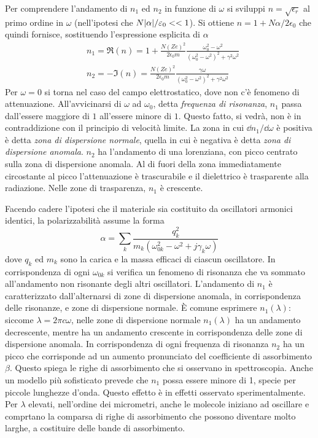 Per comprendere l'andamento di $n_1$ ed $n_2$ in funzione di $\omega$ si sviluppi $n=\sqrt{\epsilon_r}$ al primo
ordine in $\omega$ (nell'ipotesi che $N\abs{\alpha}/\varepsilon_0<<1$). Si ottiene $n=1+N\alpha/2\epsilon_0$ che
quindi fornisce, sostituendo l'espressione esplicita di $\alpha$
\[
    \begin{split}
        & n_1=\Re(n)=1+\frac{N(Ze)^2}{2\epsilon_0 m} \frac{\omega_0^2 -\omega^2}{(\omega_0^2 -\omega^2)^2+\gamma^2\omega^2}\\
        & n_2=-\Im(n)=\frac{N(Ze)^2}{2\epsilon_0 m} \frac{\gamma \omega}{(\omega_0^2 -\omega^2)^2+\gamma^2\omega^2}
    \end{split}
\]
Per $\omega=0$ si torna nel caso del campo elettrostatico, dove non c'è fenomeno di attenuazione.
All'avvicinarsi di $\omega$ ad $\omega_0$, detta \textit{frequenza di risonanza}, $n_1$ passa dall'essere
maggiore di $1$ all'essere minore di $1$. Questo fatto, si vedrà, non è in contraddizione con il
principio di velocità limite. La zona in cui $\dd{n_1}/\dd{\omega}$ è positiva è detta
\textit{zona di dispersione normale}, quella in cui è negativa è detta \textit{zona di dispersione anomala}.
$n_2$ ha l'andamento di una lorenziana, con picco centrato sulla zona di dispersione anomala.
Al di fuori della zona immediatamente circostante al picco
l'attenuazione è trascurabile e il dielettrico è trasparente alla radiazione. Nelle zone di trasparenza, $n_1$
è crescente.

Facendo cadere l'ipotesi che il materiale sia costituito da oscillatori armonici identici, la polarizzabilità assume
la forma
\[
    \alpha=\sum_k\frac{q_k^2}{m_k(\omega_{0k}^2-\omega^2+j\gamma_k\omega)}
\]
dove $q_k$ ed $m_k$ sono la carica e la massa efficaci di ciascun oscillatore. In corrispondenza di ogni $\omega_{0k}$ si verifica
un fenomeno di risonanza che va sommato all'andamento non risonante degli altri oscillatori. L'andamento di $n_1$ è caratterizzato
dall'alternarsi di zone di dispersione anomala, in corrispondenza delle risonanze, e zone di dispersione normale.
È comune esprimere $n_1(\lambda)$: siccome $\lambda=2\pi c\omega$, nelle zone di dispersione normale $n_1(\lambda)$
ha un andamento decrescente, mentre ha un andamento crescente in corrispondenza delle zone di dispersione anomala.
In corrispondenza di ogni frequenza di risonanza $n_2$ ha un picco che corrisponde ad un aumento pronunciato del
coefficiente di assorbimento $\beta$. Questo spiega le righe di assorbimento che si osservano in spettroscopia.
Anche un modello più sofisticato prevede che $n_1$ possa essere minore di 1, specie per piccole lunghezze d'onda.
Questo effetto è in effetti osservato sperimentalmente. Per $\lambda$
elevati, nell'ordine dei micrometri, anche le molecole iniziano ad oscillare e comprtano la comparsa di righe di assorbimento che
possono diventare molto larghe, a costituire delle bande di assorbimento.
